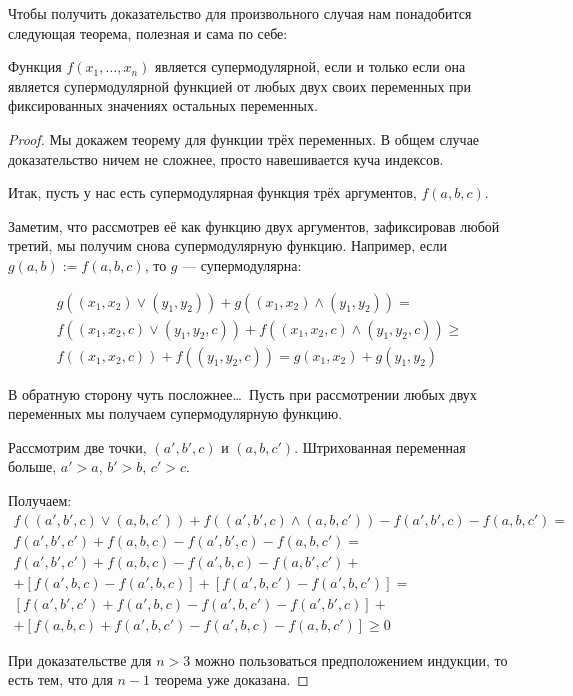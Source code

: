 Чтобы получить доказательство для произвольного случая нам понадобится следующая теорема, полезная и сама по себе:
\begin{myth}
Функция $ f(x_{1},\ldots,x_{n}) $ является супермодулярной, если и только если она является супермодулярной функцией от любых двух своих переменных при фиксированных значениях остальных переменных.
\end{myth}

\begin{proof}

Мы докажем теорему для функции трёх переменных. В общем случае доказательство ничем не сложнее, просто навешивается куча индексов.

Итак, пусть у нас есть супермодулярная функция трёх аргументов, $ f(a,b,c) $.

Заметим, что рассмотрев её как функцию двух аргументов, зафиксировав любой третий, мы получим снова супермодулярную функцию. Например, если $ g(a,b):=f(a,b,c) $, то $ g $ — супермодулярна:

\begin{multline}
g((x_{1},x_{2})\vee (y_{1},y_{2}))+g((x_{1},x_{2})\wedge (y_{1},y_{2}))=\\
f((x_{1},x_{2},c)\vee (y_{1},y_{2},c))+f((x_{1},x_{2},c)\wedge (y_{1},y_{2},c))\geq \\
f((x_{1},x_{2},c))+f((y_{1},y_{2},c))=g(x_{1},x_{2})+g(y_{1},y_{2})
\end{multline}

В обратную сторону чуть посложнее\ldots~Пусть при рассмотрении любых двух переменных мы получаем супермодулярную функцию.

Рассмотрим две точки, $(a',b',c) $ и $ (a,b,c') $. Штрихованная переменная больше, $ a'>a $, $ b'>b $, $ c'>c $.

Получаем:
\begin{multline}
f((a',b',c)\vee (a,b,c'))+f((a',b',c)\wedge (a,b,c'))-f(a',b',c)-f(a,b,c')=\\
f(a',b',c')+f(a,b,c)-f(a',b',c)-f(a,b,c')=\\
f(a',b',c')+f(a,b,c)-f(a',b,c)-f(a,b',c')+\\
+[f(a',b,c)-f(a',b,c)]+[f(a',b,c')-f(a',b,c')]=\\
[f(a',b',c')+f(a',b,c)-f(a',b,c')-f(a',b',c)]+\\
+[f(a,b,c)+f(a',b,c')-f(a',b,c)-f(a,b,c')]\geq 0
\end{multline}

При доказательстве для $ n>3 $ можно пользоваться предположением индукции, то есть тем, что для $ n-1 $ теорема уже доказана.
\end{proof}

